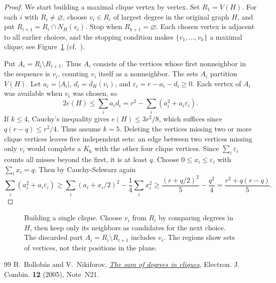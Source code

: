 \documentclass[10pt,a4paper]{amsart}
\begin{document}
\begin{proof}
We start building a maximal clique vertex by vertex. Set $R_1=V(H)$.
For each $i$ with $R_i\ne\varnothing$, choose $v_i\in R_i$ of largest
degree in the original graph $H$, and put
$R_{i+1}=R_i\cap N_H(v_i)$.
Stop when $R_{k+1}=\varnothing$. Each chosen vertex is adjacent to all
earlier choices, and the stopping condition makes
$\{v_1,\ldots,v_k\}$ a maximal clique; see Figure~\ref{greedy}
(cf.~\cite[Section~2]{BN}).

Put $A_i=R_i\setminus R_{i+1}$. Thus $A_i$ consists of the vertices
whose first nonneighbor in the sequence is $v_i$, counting $v_i$ itself
as a nonneighbor. The sets $A_i$ partition $V(H)$.
Let $a_i=|A_i|$, $d_i=d_H(v_i)$, and
$\varepsilon_i=r-a_i-d_i\ge0$.
Each vertex of $A_i$ was available when $v_i$ was chosen, so
\[
       2e(H)\le\sum_i a_i d_i
       =r^2-\sum_i(a_i^2+a_i\varepsilon_i).
\]
If $k\le4$, Cauchy's inequality gives $e(H)\le3r^2/8$, which suffices
since $q(r-q)\le r^2/4$. Thus assume $k=5$.
Deleting the vertices missing two or more clique vertices leaves five
independent sets: an edge between two vertices missing only $v_i$ would
complete a $K_6$ with the other four clique vertices. Since
$\sum_i\varepsilon_i$ counts all misses beyond the first, it is at least
$q$. Choose $0\le x_i\le\varepsilon_i$ with $\sum_i x_i=q$. Then by Cauchy-Schwarz again
\[
 \sum_i(a_i^2+a_i\varepsilon_i)
 \ge\sum_i(a_i+x_i/2)^2-\frac14\sum_i x_i^2
 \ge\frac{(r+q/2)^2}{5}-\frac{q^2}{4}
 =\frac{r^2+q(r-q)}5.
\]
\end{proof}


\begin{figure}[htbp]
\centering
{}
\caption{Building a single clique. Choose $v_i$ from $R_i$ by comparing
  degrees in $H$, then keep only its neighbors as candidates for the next
  choice. The discarded part $A_i=R_i\setminus R_{i+1}$ includes $v_i$.
  The regions show sets of vertices, not their positions in the plane.}
\label{greedy}
\end{figure}


\begin{thebibliography}{99}
 B.~Bollob\'as and V.~Nikiforov, \emph{\href{https://doi.org/10.37236/1988}{The sum of degrees in cliques}}, Electron. J. Combin. \textbf{12} (2005), Note~N21.
\end{thebibliography}
\end{document}
